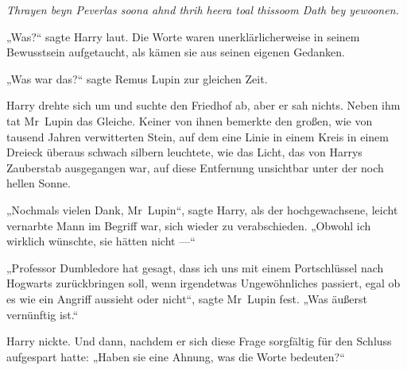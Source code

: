 \emph{Thrayen beyn Peverlas soona ahnd thrih heera toal thissoom Dath bey yewoonen.}

„Was?“ sagte Harry laut. Die Worte waren unerklärlicherweise in seinem Bewusstsein aufgetaucht, als kämen sie aus seinen eigenen Gedanken.

„Was war das?“ sagte Remus Lupin zur gleichen Zeit.

Harry drehte sich um und suchte den Friedhof ab, aber er sah nichts. Neben ihm tat Mr~Lupin das Gleiche.
Keiner von ihnen bemerkte den großen, wie von tausend Jahren verwitterten Stein, auf dem eine Linie in einem Kreis in einem Dreieck überaus schwach silbern leuchtete, wie das Licht, das von Harrys Zauberstab ausgegangen war, auf diese Entfernung unsichtbar unter der noch hellen Sonne.


„Nochmals vielen Dank, Mr~Lupin“, sagte Harry, als der hochgewachsene, leicht vernarbte Mann im Begriff war, sich wieder zu verabschieden.
„Obwohl ich wirklich wünschte, sie hätten nicht —“

„Professor Dumbledore hat gesagt, dass ich uns mit einem Portschlüssel nach Hogwarts zurückbringen soll, wenn irgendetwas Ungewöhnliches passiert, egal ob es wie ein Angriff aussieht oder nicht“, sagte Mr~Lupin fest.
„Was äußerst vernünftig ist.“

Harry nickte. Und dann, nachdem er sich diese Frage sorgfältig für den Schluss aufgespart hatte:
„Haben sie eine Ahnung, was die Worte bedeuten?“

